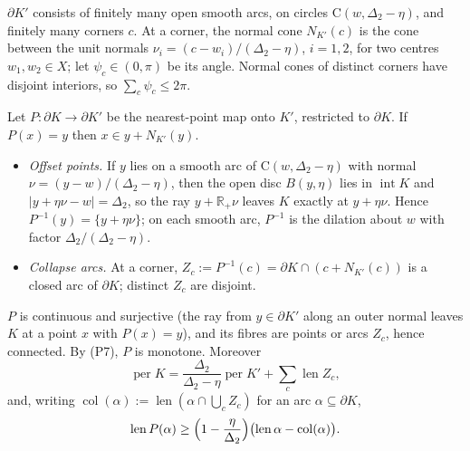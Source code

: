 \documentclass[11pt]{amsart}
\theoremstyle{definition}
\theoremstyle{remark}
\newcommand{\R}{\mathbb{R}}
\newcommand{\Dt}{\Delta_2}
\newcommand{\Cc}{\mathrm{C}}      %
\begin{document}
$\partial K'$ consists of finitely many open smooth arcs, on circles $\Cc(w,\Dt-\eta)$, and finitely many corners $c$. At a corner, the normal cone $N_{K'}(c)$ is the cone between the unit normals $\nu_i=(c-w_i)/(\Dt-\eta)$, $i=1,2$, for two centres $w_1,w_2\in X$; let $\psi_c\in(0,\pi)$ be its angle. Normal cones of distinct corners have disjoint interiors, so $\sum_c\psi_c\le2\pi$.

Let $P:\partial K\to\partial K'$ be the nearest-point map onto $K'$, restricted to $\partial K$. If $P(x)=y$ then $x\in y+N_{K'}(y)$.
\begin{itemize}[leftmargin=2em]
\item \emph{Offset points.} If $y$ lies on a smooth arc of $\Cc(w,\Dt-\eta)$ with normal $\nu=(y-w)/(\Dt-\eta)$, then the open disc $B(y,\eta)$ lies in $\operatorname{int}K$ and $|y+\eta\nu-w|=\Dt$, so the ray $y+\R_+\nu$ leaves $K$ exactly at $y+\eta\nu$. Hence $P^{-1}(y)=\{y+\eta\nu\}$; on each smooth arc, $P^{-1}$ is the dilation about $w$ with factor $\Dt/(\Dt-\eta)$.
\item \emph{Collapse arcs.} At a corner, $Z_c:=P^{-1}(c)=\partial K\cap(c+N_{K'}(c))$ is a closed arc of $\partial K$; distinct $Z_c$ are disjoint.
\end{itemize}
$P$ is continuous and surjective (the ray from $y\in\partial K'$ along an outer normal leaves $K$ at a point $x$ with $P(x)=y$), and its fibres are points or arcs $Z_c$, hence connected. By (P7), $P$ is monotone. Moreover
\begin{equation}\label{eq:perKprime}
\operatorname{per}K=\frac{\Dt}{\Dt-\eta}\operatorname{per}K'+\sum_c\operatorname{len}Z_c,
\end{equation}
and, writing $\operatorname{col}(\alpha):=\operatorname{len}(\alpha\cap\bigcup_cZ_c)$ for an arc $\alpha\subseteq\partial K$,
\begin{equation}\label{eq:lenP}
\operatorname{len}P(\alpha)\ge\Bigl(1-\frac{\eta}{\Dt}\Bigr)\bigl(\operatorname{len}\alpha-\operatorname{col}(\alpha)\bigr).
\end{equation}
\end{document}
